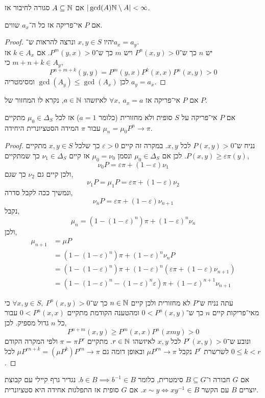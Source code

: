 \begin{proposition}
	אם $A \subseteq \NN$ סגורה לחיבור אז $|\gcd(A) \NN \setminus A| < \infty$.
\end{proposition}
\begin{proposition}
	אם $P$ אי־פריקה אז כל ה־$a_x$ שווים.
\end{proposition}
\begin{proof}
	יהיו $x, y \in S$ ונרצה להראות ש־$a_x = a_y$. \\
	יש $n$ כך ש־$P^n(x, y) > 0$ ויש $m$ כך ש־$P^m(y, x) > 0$.
	אם $k \in A_x$ אז $m + n + k \in A_y$ כי,
	\[
		P^{n + m + k}(y, y) = P^m(y, x) P^k(x, x) P^n(x, y) > 0
	\]
	לכן $\gcd(A_y) \le \gcd(A_x)$ ומסימטריה $a_y = a_x$.
\end{proof}
\begin{corollary}
	אם $P$ אי־פריקה אז $\forall x,\ a_x = a$ לאיזשהו $a \in \NN$, נקרא לו המחזור של $P$.
\end{corollary}
\begin{theorem}
	אם $P$ אי־פריקה על $S$ סופית ולא מחזורית (כלומר $a = 1$) אז לכל $\mu_0 \in \Delta_S$ מתקיים $\mu_n = \mu_0 P^n \to \pi$ עבור $\pi$ המידה הסטציונרית היחידה.
\end{theorem}
\begin{proof}
	נניח ש־$P(x, y) > 0$ לכל $x, y$.
	במקרה זה קיים $\varepsilon > 0$ כך שלכל $x, y \in S$ מתקיים $P(x, y) \ge \varepsilon \pi(y)$.
	לכן אם $\mu_0 \in \Delta_S$ ונסמן $\mu_0 = \nu_0$ אז קיים $\nu_1 \in \Delta_S$ כך שמתקיים,
	\[
		\nu_0 P
		= \varepsilon \pi + (1 - \varepsilon) \nu_1
	\]
	ולכן קיים גם $\nu_2$ כך שגם,
	\[
		\nu_1 P
		= \mu_1 P
		= \varepsilon \pi + (1 - \varepsilon) \nu_2
	\]
	ונמשיך ככה לקבל סדרה,
	\[
		\nu_n P
		= \varepsilon \pi + (1 - \varepsilon) \nu_{n + 1}
	\]
	נקבל,
	\[
		\mu_n
		= (1 - {(1 - \varepsilon)}^n) \pi + {(1 - \varepsilon)}^n \nu_n
	\]
	ולכן,
	\begin{align*}
		\mu_{n + 1}
		& = \mu P \\
		& = (1 - {(1 - \varepsilon)}^n) \pi + {(1 - \varepsilon)}^n \nu_n P \\
		& = (1 - {(1 - \varepsilon)}^n) \pi + {(1 - \varepsilon)}^n (\varepsilon \pi + (1 - \varepsilon) \nu_{n + 1}) \\
		& = (1 - {(1 - \varepsilon)}^n - {(1 - \varepsilon)}^n \varepsilon) \pi + {(1 - \varepsilon)}^{n + 1} \nu_{n + 1}
	\end{align*}

	עתה נניח ש־$P$ לא מחזורית ולכן קיים $n \in \NN$ כך ש־$\forall x, y \in S,\ P^n(x, y) > 0$ כי מאי־פריקות קיים $n$ כך ש־$0 < P^n(x, y)$ ומהטענה הקודמת מתקיים $0 < P^n(x, x)$ עבור כל $n$ גדול מספיק.
	לכן,
	\[
		P^{n + m}(x, y)
		\ge P^m(x, x) P^n(xm y) > 0
	\]
	ונובע ש־$P^r(x, y) > 0$ לכל $x, y$ לאיזשהו $r \in \NN$.
	מתקיים $\pi = \pi P^r$ ולפי המקרה הקודם לשרשרת $P^r$ נקבל $\mu P^{r n} \to \pi$ ובאופן דומה גם $\mu P^{rn + k} = (\mu P^k) P^{r n} \to \pi$ לכל $0 \le k < r$.
\end{proof}
\begin{definition}
	אם $G$ חבורה ו־$B \subseteq G$ סימטרית, כלומר $b \in B \implies b^{-1} \in B$.
	נגדיר גרף קיילי עם קבוצת יוצרים $B$ עם הקשר $x \sim y \iff x y^{-1} \in B$.
	אם $G$ סופית אז התפלגות אחידה היא סטציונרית.
\end{definition}


